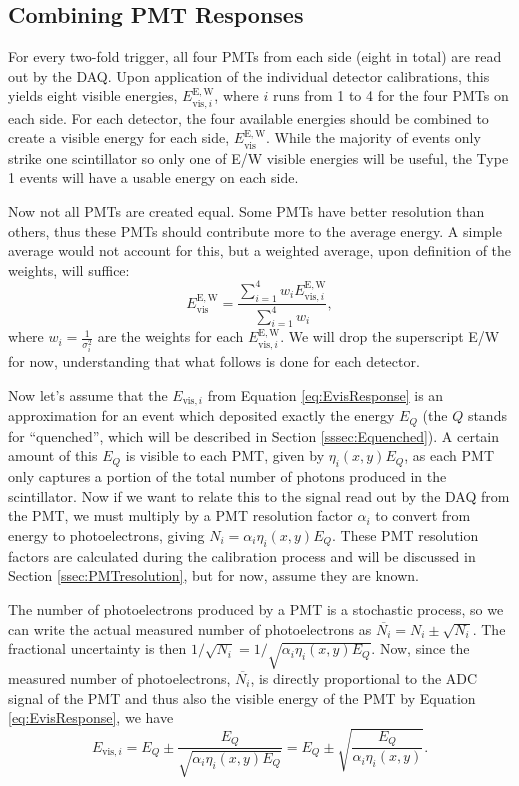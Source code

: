 \subsection{Combining PMT Responses} \label{ssec:combinePMT}

For every two-fold trigger, all four PMTs from each side (eight in total) are read out by the
DAQ. Upon application of the individual detector calibrations, this yields
eight visible energies, $E_{\mathrm{vis},i}^\mathrm{E,W}$, where $i$ runs from 1 to 4 for the
four PMTs on each side. For each detector, the four available energies should
be combined to create a visible energy for each side, $E_{\mathrm{vis}}^\mathrm{E,W}$. While the
majority of events only strike one scintillator so only one of E/W visible energies will
be useful, the Type 1 events will have a usable energy on each side.

Now not all PMTs are created equal. Some PMTs have better resolution than others, thus these PMTs
should contribute more to the average energy. A simple average would not account for this, but
a weighted average, upon definition of the weights, will suffice:
%
\begin{equation}
  E_{\mathrm{vis}}^\mathrm{E,W} = \frac{\sum_{i=1}^{4} w_i E_{\mathrm{vis},i}^{\mathrm{E,W}}}{\sum_{i=1}^{4} w_i},
\end{equation}
%
where $w_i=\frac{1}{\sigma_i^2}$ are the weights for each $E_{\mathrm{vis},i}^{\mathrm{E,W}}$. We will drop the superscript
E/W for now, understanding that what follows is done for each detector.

Now let's assume that the $E_{\mathrm{vis},i}$ from Equation \ref{eq:EvisResponse} is an approximation
for an event which deposited exactly the energy $E_Q$ (the $Q$ stands for ``quenched'', which will
be described in Section \ref{sssec:Equenched}). A certain amount of this $E_Q$ is visible to each
PMT, given by $\eta_i(x,y)E_Q$, as each PMT only captures a portion of the total number of photons produced
in the scintillator.
Now if we want to relate this to the signal read out by the DAQ
from the PMT, we must multiply by a PMT resolution factor $\alpha_i$ to convert from energy
to photoelectrons, giving $N_i = \alpha_i \eta_i(x,y) E_Q$.
These PMT resolution factors are calculated during the calibration process
and will be discussed in Section \ref{ssec:PMTresolution}, but for now, assume they are known.

The number of photoelectrons produced by a PMT is a stochastic process, so we can write the actual
measured number of photoelectrons as $\overline{N_i} = N_i \pm \sqrt{N_i}$. The fractional uncertainty
is then $1/\sqrt{N_i} = 1/\sqrt{\alpha_i \eta_i(x,y) E_Q}$. Now, since the measured number of photoelectrons,
$\overline{N_i}$, is directly proportional to the ADC signal of the PMT and thus also the visible energy
of the PMT by Equation \ref{eq:EvisResponse}, we have
%
\begin{equation}
  E_{\mathrm{vis},i} = E_Q \pm \frac{E_Q}{\sqrt{\alpha_i \eta_i(x,y) E_Q}} =  E_Q \pm \sqrt{\frac{E_Q}{\alpha_i \eta_i(x,y)}}.
\end{equation}
%

